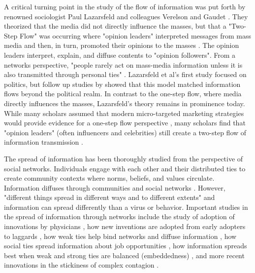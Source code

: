 A critical turning point in the study of the flow of information was put forth by
renowned sociologist Paul Lazarsfeld and colleagues Verelson and Gaudet \citeyearpar{lazarsfeldPeopleChoice1944}.
They theorized that the media did not directly influence the
masses, but that a "Two-Step Flow" was occurring where "opinion leaders"
interpreted messages from mass media and then, in turn, promoted their opinions
to the masses \citep{katzPersonalInfluencePart1955}. The opinion leaders
interpret, explain, and diffuse contents to "opinion followers". From a networks
perspective, "people rarely act on mass-media information unless it is also
transmitted through personal ties" \citep[p. 1374]{granovetterStrengthWeakTies1973}. 
Lazarsfeld et al's \citeyearpar{lazarsfeldPeopleChoice1944} first study focused on
politics, but follow up studies by \citet{katzPersonalInfluencePart1955} showed
that this model matched information flows beyond the political realm. In
contrast to the one-step flow, where media directly influences the masses,
Lazarsfeld's theory remains in prominence today. While many scholars assumed
that modern micro-targeted marketing strategies would provide evidence for a
one-step flow perspective \citep{bennettOneStepFlowCommunication2006}, many
scholars find that "opinion leaders" (often influencers and celebrities) still
create a two-step flow of information transmission \citep{choi15,
hilbertOneStepTwo2017}.

The spread of information has been thoroughly studied from the perspective
of social networks. Individuals engage with each other and their distributed
ties to create community contexts where norms, beliefs, and values circulate.
Information diffuses through communities and social networks
\citep{fowler2010cooperative, bond_etal12, klarEffectNetworkStructure2017}.
However, "different things spread in different ways and to different extents"
\citep[p. 563]{christakisSocialContagionTheory2013} and information can spread
differently than a virus or behavior. Important studies in the spread of
information through networks include the study of adoption of innovations by
physicians \citep{colemanDiffusionInnovationPhysicians1957}, how new inventions
are adopted from early adopters to laggards
\citep{rogersDiffusionInnovations1962}, how weak ties help bind networks and
diffuse information \citep{granovetterStrengthWeakTies1973}, how social ties
spread information about job opportunities
\citep{granovetterGettingJobStudy1995, montgomeryJobSearchNetwork1992}, how
information spreads best when weak and strong ties are balanced (embeddedness)
\citep{uzziSocialStructureCompetition1997}, and more recent innovations in the
stickiness of complex contagion \citep{centolaComplexContagionsWeakness2007}.


